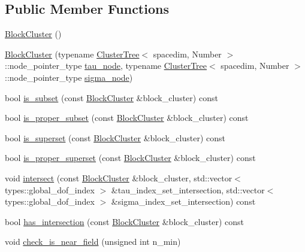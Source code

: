 \subsection*{Public Member Functions}
\textbf{ }\par
\begin{DoxyCompactItemize}
\item 
\hyperlink{classBlockCluster_a0b85fdaddc12a14d57db884e287cd24e}{Block\+Cluster} ()
\item 
\hyperlink{classBlockCluster_a63fdb3f4bea6a446b34cb34274731df0}{Block\+Cluster} (typename \hyperlink{classClusterTree}{Cluster\+Tree}$<$ spacedim, Number $>$\+::node\+\_\+pointer\+\_\+type \hyperlink{classBlockCluster_aac88834478cb4e409596e58100a5e9de}{tau\+\_\+node}, typename \hyperlink{classClusterTree}{Cluster\+Tree}$<$ spacedim, Number $>$\+::node\+\_\+pointer\+\_\+type \hyperlink{classBlockCluster_ae1005ec7feedbdb990b27d845b24bad2}{sigma\+\_\+node})
\item 
bool \hyperlink{classBlockCluster_af479a9471d056baa51a3f300bd0a5a27}{is\+\_\+subset} (const \hyperlink{classBlockCluster}{Block\+Cluster} \&block\+\_\+cluster) const
\item 
bool \hyperlink{classBlockCluster_a9963a6320591f82824398667bcb9cdf8}{is\+\_\+proper\+\_\+subset} (const \hyperlink{classBlockCluster}{Block\+Cluster} \&block\+\_\+cluster) const
\item 
bool \hyperlink{classBlockCluster_a445fc9afc9a246f7d3832c9c96c16d21}{is\+\_\+superset} (const \hyperlink{classBlockCluster}{Block\+Cluster} \&block\+\_\+cluster) const
\item 
bool \hyperlink{classBlockCluster_ad81d5a494f48b16662ef471966899b65}{is\+\_\+proper\+\_\+superset} (const \hyperlink{classBlockCluster}{Block\+Cluster} \&block\+\_\+cluster) const
\item 
void \hyperlink{classBlockCluster_a361efceed1f584db66a518007b5af633}{intersect} (const \hyperlink{classBlockCluster}{Block\+Cluster} \&block\+\_\+cluster, std\+::vector$<$ types\+::global\+\_\+dof\+\_\+index $>$ \&tau\+\_\+index\+\_\+set\+\_\+intersection, std\+::vector$<$ types\+::global\+\_\+dof\+\_\+index $>$ \&sigma\+\_\+index\+\_\+set\+\_\+intersection) const
\item 
bool \hyperlink{classBlockCluster_adf556b6483f3a81a39d3625c15e9787d}{has\+\_\+intersection} (const \hyperlink{classBlockCluster}{Block\+Cluster} \&block\+\_\+cluster) const
\item 
void \hyperlink{classBlockCluster_a44900c760eac0578f700fa678ef4e416}{check\+\_\+is\+\_\+near\+\_\+field} (unsigned int n\+\_\+min)

\end{DoxyCompactItemize}
